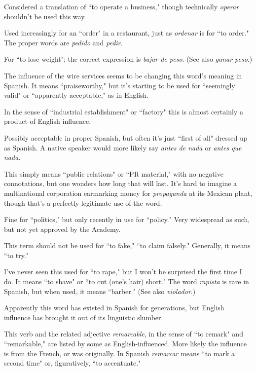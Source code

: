  Considered a translation of ``to operate a business," though technically \emph{operar} shouldn't be used this way.

 Used increasingly for an ``order" in a restaurant, just
as \emph{ordenar} is for ``to order." The proper words are \emph{pedido} and \emph{pedir}.

 For ``to lose weight"; the correct expression is
\emph{bajar de peso}. (See also \emph{ganar peso}.)

 The influence of the wire services seems to be
changing this word's meaning in Spanish. It means ``praiseworthy," but
it's starting to be used for ``seemingly valid" or ``apparently acceptable," as in English.

 In the sense of ``industrial establishment" or ``factory" this is almost certainly a product of English influence.

 Possibly acceptable in proper Spanish,
but often it's just ``first of all" dressed up as Spanish. A native speaker
would more likely say \emph{antes de nada} or \emph{antes que nada}.

 This simply means ``public relations" or ``PR
material," with no negative connotations, but one wonders how long
that will last. It's hard to imagine a multinational corporation earmarking money for \emph{propaganda} at its Mexican plant, though that's
a perfectly legitimate use of the word.

 Fine for ``politics," but only recently in use for ``policy." Very widespread as such, but not yet approved by the Academy.

 This term should not be used for ``to fake," ``to
claim falsely." Generally, it means ``to try."

 I've never seen this used for ``to rape," but I won't be
surprised the first time I do. It means ``to shave" or ``to cut (one's hair)
short." The word \emph{rapista} is rare in Spanish, but when used, it means
``barber." (See also \emph{violador}.)

 Apparently this word has existed in Spanish
for generations, but English influence has brought it out of its linguistic slumber.

 This verb and the related adjective \emph{remarcable},
in the sense of ``to remark" and ``remarkable," are listed by some as
English-influenced. More likely the influence is from the French, or
was originally. In Spanish \emph{remarcar} means ``to mark a second time"
or, figuratively, ``to accentuate."

